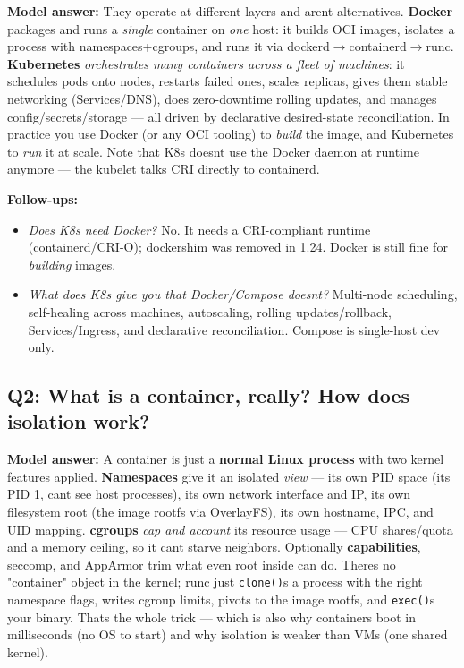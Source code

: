 \documentclass[11pt]{article}
\providecommand{\tightlist}{\setlength{\itemsep}{1pt}\setlength{\parskip}{0pt}}
\begin{document}
\textbf{Model answer:}
They operate at different layers and aren\textquotesingle t alternatives. \textbf{Docker} packages and runs a \emph{single} container on \emph{one} host: it builds OCI images, isolates a process with namespaces+cgroups, and runs it via dockerd\(\rightarrow\)containerd\(\rightarrow\)runc. \textbf{Kubernetes} \emph{orchestrates many containers across a fleet of machines}: it schedules pods onto nodes, restarts failed ones, scales replicas, gives them stable networking (Services/DNS), does zero-downtime rolling updates, and manages config/secrets/storage --- all driven by declarative desired-state reconciliation. In practice you use Docker (or any OCI tooling) to \emph{build} the image, and Kubernetes to \emph{run} it at scale. Note that K8s doesn\textquotesingle t use the Docker daemon at runtime anymore --- the kubelet talks CRI directly to containerd.

\textbf{Follow-ups:}

\begin{itemize}
\tightlist
\item
  \emph{Does K8s need Docker?} No. It needs a CRI-compliant runtime (containerd/CRI-O); dockershim was removed in 1.24. Docker is still fine for \emph{building} images.
\item
  \emph{What does K8s give you that Docker/Compose doesn\textquotesingle t?} Multi-node scheduling, self-healing across machines, autoscaling, rolling updates/rollback, Services/Ingress, and declarative reconciliation. Compose is single-host dev only.
\end{itemize}

\subsection{Q2: What is a container, really? How does isolation work?}\label{q2-what-is-a-container-really-how-does-isolation-work}

\textbf{Model answer:}
A container is just a \textbf{normal Linux process} with two kernel features applied. \textbf{Namespaces} give it an isolated \emph{view} --- its own PID space (it\textquotesingle s PID 1, can\textquotesingle t see host processes), its own network interface and IP, its own filesystem root (the image rootfs via OverlayFS), its own hostname, IPC, and UID mapping. \textbf{cgroups} \emph{cap and account} its resource usage --- CPU shares/quota and a memory ceiling, so it can\textquotesingle t starve neighbors. Optionally \textbf{capabilities}, seccomp, and AppArmor trim what even root inside can do. There\textquotesingle s no "container" object in the kernel; runc just \texttt{clone()}s a process with the right namespace flags, writes cgroup limits, pivots to the image rootfs, and \texttt{exec()}s your binary. That\textquotesingle s the whole trick --- which is also why containers boot in milliseconds (no OS to start) and why isolation is weaker than VMs (one shared kernel).
\end{document}
